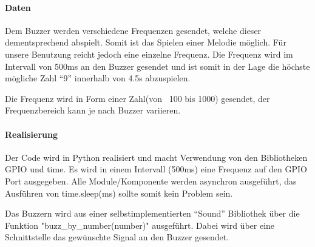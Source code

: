\documentclass[../../main.tex]{subfiles}
\begin{document}
\paragraph{Daten}
Dem Buzzer werden verschiedene Frequenzen gesendet, welche dieser dementsprechend abspielt. Somit ist das Spielen einer Melodie möglich. Für unsere Benutzung reicht jedoch eine einzelne Frequenz. Die Frequenz wird im Intervall von 500ms an den Buzzer gesendet und ist somit in der Lage die höchste mögliche Zahl ``9'' innerhalb von 4.5s abzuspielen.

Die Frequenz wird in Form einer Zahl(von ~100 bis 1000) gesendet, der Frequenzbereich kann je nach Buzzer variieren.

\paragraph{Realisierung}
Der Code wird in Python realisiert und macht Verwendung von den Bibliotheken GPIO und time. Es wird in einem Intervall (500ms) eine Frequenz auf den GPIO Port ausgegeben. Alle Module/Komponente werden asynchron ausgeführt, das Ausführen von time.sleep(ms) sollte somit kein Problem sein.

Das Buzzern wird aus einer selbstimplementierten ``Sound'' Bibliothek über die Funktion "buzz\_by\_number(number)" ausgeführt. Dabei wird über eine Schnittstelle das gewünschte Signal an den Buzzer gesendet.
\end{document}
